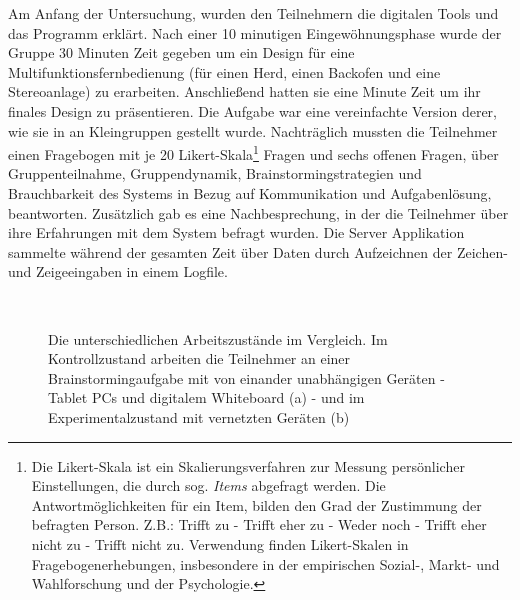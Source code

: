 \medskip Am Anfang der Untersuchung, wurden den Teilnehmern die digitalen Tools und das Programm erklärt. Nach einer 10 minutigen Eingewöhnungsphase wurde der Gruppe 30 Minuten Zeit gegeben um ein Design für eine Multifunktionsfernbedienung (für einen Herd, einen Backofen und eine Stereoanlage) zu erarbeiten. Anschließend hatten sie eine Minute Zeit um ihr finales Design zu präsentieren. Die Aufgabe war eine vereinfachte Version derer, wie sie in \citep{Tang1991143} an Kleingruppen gestellt wurde. Nachträglich mussten die Teilnehmer einen Fragebogen mit je 20 Likert-Skala\footnote{Die Likert-Skala ist ein Skalierungsverfahren zur Messung persönlicher Einstellungen, die durch sog. \emph{Items} abgefragt werden. Die Antwortmöglichkeiten für ein Item, bilden den Grad der Zustimmung der befragten Person. Z.B.: Trifft zu - Trifft eher zu - Weder noch - Trifft eher nicht zu - Trifft nicht zu. Verwendung finden Likert-Skalen in Fragebogenerhebungen, insbesondere in der empirischen Sozial-, Markt- und Wahlforschung und der Psychologie.} Fragen und sechs offenen Fragen, über Gruppenteilnahme, Gruppendynamik, Brainstormingstrategien und Brauchbarkeit des Systems in Bezug auf Kommunikation und Aufgabenlösung, beantworten. Zusätzlich gab es eine Nachbesprechung, in der die Teilnehmer über ihre Erfahrungen mit dem System befragt wurden. Die Server Applikation sammelte während der gesamten Zeit über Daten durch Aufzeichnen der Zeichen- und Zeigeeingaben in einem Logfile.

\begin{figure}
        \myfloatalign
         \quad
         \\
        \caption[Die unterschiedlichen Arbeitszustände im Vergleich \newline \citep{BasteaForte:2007}]{Die unterschiedlichen Arbeitszustände im Vergleich. Im Kontrollzustand arbeiten die Teilnehmer an einer Brainstormingaufgabe mit von einander unabhängigen Geräten - Tablet PCs und digitalem Whiteboard (a) - und im Experimentalzustand mit vernetzten Geräten (b)}\label{fig:basteaConditionExperimental}
\end{figure}

